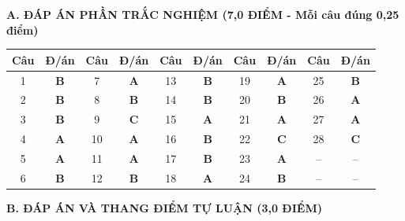 \documentclass[12pt, a4paper]{article}
\begin{document}
\noindent \textbf{A. ĐÁP ÁN PHẦN TRẮC NGHIỆM (7,0 ĐIỂM - Mỗi câu đúng 0,25 điểm)}
\begin{center}
\small
\begin{tabular}{|c|c|c|c|c|c|c|c|c|c|}
\hline
\textbf{Câu} & \textbf{Đ/án} & \textbf{Câu} & \textbf{Đ/án} & \textbf{Câu} & \textbf{Đ/án} & \textbf{Câu} & \textbf{Đ/án} & \textbf{Câu} & \textbf{Đ/án} \\ \hline
1 & \textbf{B} & 7 & \textbf{A} & 13 & \textbf{B} & 19 & \textbf{A} & 25 & \textbf{B} \\ \hline
2 & \textbf{B} & 8 & \textbf{B} & 14 & \textbf{B} & 20 & \textbf{B} & 26 & \textbf{A} \\ \hline
3 & \textbf{B} & 9 & \textbf{C} & 15 & \textbf{A} & 21 & \textbf{A} & 27 & \textbf{A} \\ \hline
4 & \textbf{A} & 10 & \textbf{A} & 16 & \textbf{B} & 22 & \textbf{C} & 28 & \textbf{C} \\ \hline
5 & \textbf{A} & 11 & \textbf{A} & 17 & \textbf{B} & 23 & \textbf{A} & -- & -- \\ \hline
6 & \textbf{B} & 12 & \textbf{B} & 18 & \textbf{A} & 24 & \textbf{B} & -- & -- \\ \hline
\end{tabular}
\end{center}

\vspace{5pt}

\noindent \textbf{B. ĐÁP ÁN VÀ THANG ĐIỂM TỰ LUẬN (3,0 ĐIỂM)}
\end{document}
